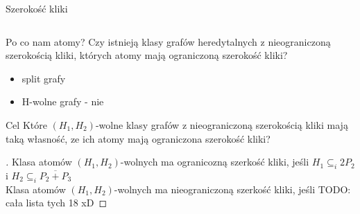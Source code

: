 \documentclass[polish]{beamer}
\begin{document}
\begin{frame}{Szerokość kliki}
\begin{examples}
\begin{columns}[t]
        \end{columns}
    \end{examples}
\end{frame}

\begin{frame}{Po co nam atomy?}
    Czy istnieją klasy grafów heredytalnych z nieograniczoną szerokością kliki, których atomy mają ograniczoną szerokość kliki?
    \begin{itemize}
        \item split grafy
        \item H-wolne grafy - nie
    \end{itemize}
\end{frame}

\begin{frame}{Cel}
    Które $(H_1, H_2)$-wolne klasy grafów z nieograniczoną szerokością kliki mają taką własność, ze ich atomy mają ograniczona szerokość kliki?
    \pause 
    \begin{proof}[]
        \renewcommand{\qedsymbol}{}
        Klasa atomów $(H_1, H_2)$-wolnych ma ogranicozną szerkość kliki, jeśli
        $H_1 \subseteq_i 2P_2$ i $ H_2 \subseteq_i \overline{P_2 + P_3}$ \\
        \pause
        Klasa atomów $(H_1, H_2)$-wolnych ma nieograniczoną szerkość kliki, jeśli
        TODO: cała lista tych 18 xD
    \end{proof}
\end{frame}
\end{document}
